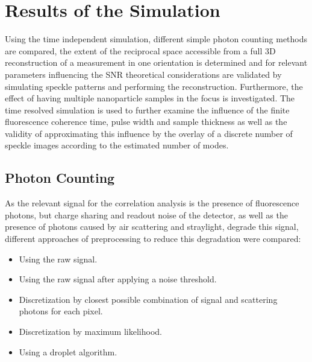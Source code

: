 
\clearpage
\section{Results of the Simulation}
Using the time independent simulation, different simple photon counting methods are compared, the extent of the reciprocal space accessible from a full 3D reconstruction of a measurement in one orientation is determined and for relevant parameters influencing the SNR theoretical considerations are validated by simulating speckle patterns and performing the reconstruction. Furthermore, the effect of having multiple nanoparticle samples in the focus is investigated. The time resolved simulation is used to further examine the influence of the finite fluorescence coherence time, pulse width and sample thickness as well as the validity of approximating this influence by the overlay of a discrete number of speckle images according to the estimated number of modes.

\subsection{Photon Counting}
As the relevant signal for the correlation analysis is the presence of fluorescence photons, but charge sharing and readout noise of the detector, as well as the presence of photons caused by air scattering and straylight, degrade this signal, different approaches of preprocessing to reduce this degradation were compared:
\begin{samepage}
	\begin{itemize}[nosep]
		\item Using the raw signal.
		\item Using the raw signal after applying a noise threshold.
		\item Discretization by closest possible combination of signal and scattering photons for each pixel.
		\item Discretization by maximum likelihood.
		\item Using a droplet algorithm.
	\end{itemize}
\end{samepage}

